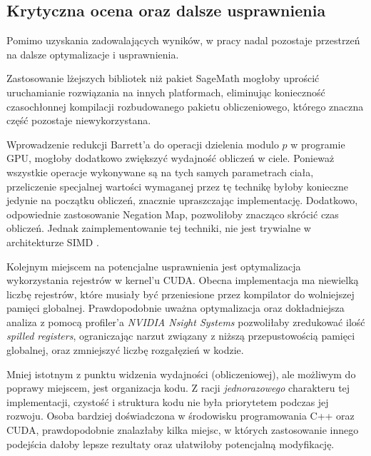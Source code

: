 \subsection{Krytyczna ocena oraz dalsze usprawnienia}
Pomimo uzyskania zadowalających wyników,
w pracy nadal pozostaje przestrzeń na dalsze optymalizacje i usprawnienia.
\par
Zastosowanie lżejszych bibliotek niż pakiet SageMath mogłoby uprościć  
uruchamianie rozwiązania na innych platformach, eliminując konieczność  
czasochłonnej kompilacji rozbudowanego pakietu obliczeniowego, którego znaczna  
część pozostaje niewykorzystana.
\par
Wprowadzenie redukcji Barrett'a do operacji  
dzielenia modulo $p$ w programie GPU, mogłoby dodatkowo zwiększyć wydajność obliczeń w ciele.  
Ponieważ wszystkie operacje wykonywane są na tych samych parametrach ciała,
przeliczenie specjalnej wartości wymaganej przez tę technikę byłoby konieczne 
jedynie na początku obliczeń, znacznie upraszczając implementację.
Dodatkowo, odpowiednie zastosowanie Negation Map, pozwoliłoby znacząco skrócić czas obliczeń.
Jednak zaimplementowanie tej techniki, nie jest trywialne w architekturze SIMD \cite{Negation}.
\par
Kolejnym miejscem na potencjalne usprawnienia jest optymalizacja wykorzystania 
rejestrów w kernel'u CUDA. Obecna implementacja ma niewielką liczbę rejestrów,
które musiały być przeniesione przez kompilator do wolniejszej pamięci
globalnej. Prawdopodobnie uważna optymalizacja oraz dokładniejsza analiza z
pomocą profiler'a \textit{NVIDIA Nsight Systems} pozwoliłaby zredukować ilość
\textit{spilled registers}, ograniczając narzut związany z niższą
przepustowością pamięci globalnej, oraz zmniejszyć liczbę rozgałęzień w kodzie.
\par
Mniej istotnym z punktu widzenia wydajności (obliczeniowej),
ale możliwym do poprawy miejscem, jest organizacja kodu.
Z racji \textit{jednorazowego} charakteru tej implementacji,
czystość i struktura kodu nie była priorytetem podczas jej rozwoju.
Osoba bardziej doświadczona w środowisku programowania C++ oraz CUDA, prawdopodobnie
znalazłaby kilka miejsc, w których zastosowanie innego podejścia dałoby lepsze rezultaty
oraz ułatwiłoby potencjalną modyfikację.